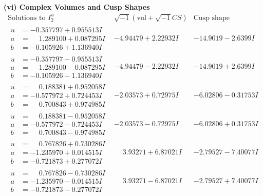 \documentclass[1p]{elsarticle_modified}
\theoremstyle{definition}
\newcommand{\I}{\sqrt{-1}}
\begin{document}
\newpage\flushleft \textbf{(vi) Complex Volumes and Cusp Shapes}
$$\begin{array}{c|c|c}  
\text{Solutions to }I^u_{2}& \I (\text{vol} + \sqrt{-1}CS) & \text{Cusp shape}\\
 \hline 
\begin{aligned}
u &= -0.357797 + 0.955513 I \\
a &= \phantom{-}1.289100 + 0.087295 I \\
b &= -0.105926 + 1.136940 I\end{aligned}
 & -4.94479 + 2.22932 I & -14.9019 - 2.6399 I \\ \hline\begin{aligned}
u &= -0.357797 - 0.955513 I \\
a &= \phantom{-}1.289100 - 0.087295 I \\
b &= -0.105926 - 1.136940 I\end{aligned}
 & -4.94479 - 2.22932 I & -14.9019 + 2.6399 I \\ \hline\begin{aligned}
u &= \phantom{-}0.188381 + 0.952058 I \\
a &= -0.577972 + 0.724453 I \\
b &= \phantom{-}0.700843 + 0.974985 I\end{aligned}
 & -2.03573 + 0.72975 I & -6.02806 - 0.31753 I \\ \hline\begin{aligned}
u &= \phantom{-}0.188381 - 0.952058 I \\
a &= -0.577972 - 0.724453 I \\
b &= \phantom{-}0.700843 - 0.974985 I\end{aligned}
 & -2.03573 - 0.72975 I & -6.02806 + 0.31753 I \\ \hline\begin{aligned}
u &= \phantom{-}0.767826 + 0.730286 I \\
a &= -1.235970 + 0.014515 I \\
b &= -0.721873 + 0.277072 I\end{aligned}
 & \phantom{-}3.93271 + 6.87021 I & -2.79527 - 7.40077 I \\ \hline\begin{aligned}
u &= \phantom{-}0.767826 - 0.730286 I \\
a &= -1.235970 - 0.014515 I \\
b &= -0.721873 - 0.277072 I\end{aligned}
 & \phantom{-}3.93271 - 6.87021 I & -2.79527 + 7.40077 I \\ \hline\begin{aligned}

\end{aligned}
\end{array}$$
\end{document}
